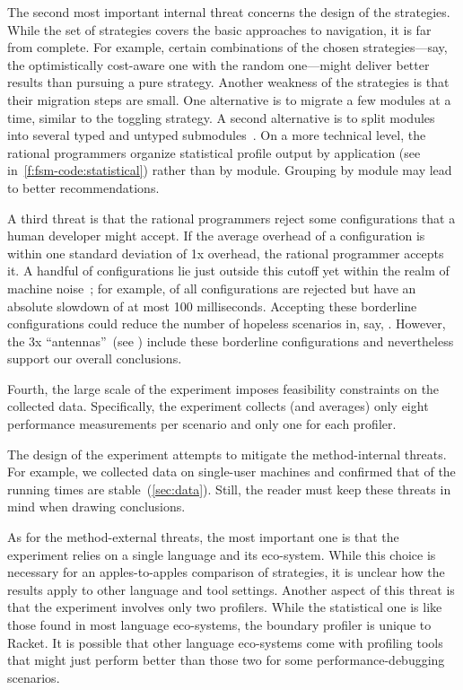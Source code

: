 The second most important internal threat concerns the design of the strategies.
While the set of strategies covers the basic approaches to navigation,
it is far from complete. For example, certain combinations of the
chosen strategies---say, the optimistically cost-aware one with the random
one---might deliver better results than pursuing a pure strategy.  Another
weakness of the strategies is that their migration steps are small.
One alternative is to migrate a few modules at a time, similar to the toggling
strategy.
A second alternative is to split modules into several typed and untyped
submodules~\cite{f:submodules}.
On a more technical level, the rational programmers organize statistical
profile output by application (see  in~\cref{f:fsm-code:statistical})
rather than by module.
Grouping by module may lead to better recommendations.

A third threat is that the rational programmers reject some configurations that
a human developer might accept.
If the average overhead of a configuration is within one standard deviation
of 1x overhead, the rational programmer accepts it.
A handful of configurations lie just outside this cutoff yet within the realm
of machine noise~\cite{mdhs:wrong-data}; for example,
 of all configurations are rejected but have an absolute slowdown
of at most 100 milliseconds.
Accepting these borderline configurations could reduce the number of hopeless
scenarios in, say, .
However, the 3x ``antennas''~(see ) include these borderline configurations and
nevertheless support our overall
conclusions.

Fourth, the large scale of the experiment imposes
feasibility constraints on the collected data. Specifically, the experiment 
collects (and averages) only eight performance measurements per scenario
and only one for each profiler.

The design of the experiment attempts to mitigate the
method-internal threats. For example, we collected data on
single-user machines and confirmed that  of the running
times are stable~(\cref{sec:data}).
Still, the reader must keep these threats in mind when drawing conclusions.

As for the method-external threats, the most important one is that the experiment
relies on a single language and its eco-system. While this choice is necessary for
an apples-to-apples comparison of strategies, it is unclear how the results apply
to other language and tool settings. Another aspect of this threat is that the
experiment involves only two profilers. While the statistical one is like those
found in most language eco-systems, the boundary profiler is unique to Racket. It
is possible that other language eco-systems come with profiling tools that might
just perform better than those two for some performance-debugging scenarios.

